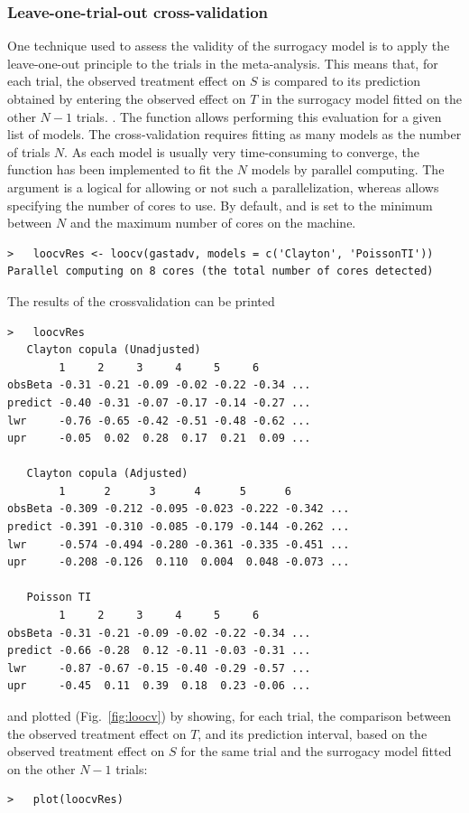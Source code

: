 \documentclass[]{scrartcl}\usepackage[]{graphicx}\usepackage[]{color}
\begin{document}
{{%
\subsubsection{Leave-one-trial-out cross-validation}
One technique used to assess the validity of the surrogacy model
  is to apply the leave-one-out principle to the trials in the meta-analysis.
This means that, for each trial, the observed treatment effect on $S$
  is compared to its prediction obtained by
  entering the observed effect on $T$
  in the surrogacy model fitted on the other $N-1$ trials.
\citep{Michiels09, Mauguen13, Rotolo17}.
The function  allows performing this evaluation for
  a given list of models.
The cross-validation requires fitting as many models as the number of trials $N$.
As each model is usually very time-consuming to converge,
  the function  has been implemented to
  fit the $N$ models by parallel computing.
The argument  is a logical for allowing or not such a parallelization,
  whereas  allows specifying the number of cores to use.
By default,  and  is set to the minimum
  between $N$ and the maximum number of cores on the machine.
\begin{lstlisting}
>   loocvRes <- loocv(gastadv, models = c('Clayton', 'PoissonTI'))
Parallel computing on 8 cores (the total number of cores detected)
\end{lstlisting}
The results of the crossvalidation can be printed
\begin{lstlisting}
>   loocvRes
   Clayton copula (Unadjusted) 
        1     2     3     4     5     6        
obsBeta -0.31 -0.21 -0.09 -0.02 -0.22 -0.34 ...
predict -0.40 -0.31 -0.07 -0.17 -0.14 -0.27 ...
lwr     -0.76 -0.65 -0.42 -0.51 -0.48 -0.62 ...
upr     -0.05  0.02  0.28  0.17  0.21  0.09 ...

   Clayton copula (Adjusted) 
        1      2      3      4      5      6         
obsBeta -0.309 -0.212 -0.095 -0.023 -0.222 -0.342 ...
predict -0.391 -0.310 -0.085 -0.179 -0.144 -0.262 ...
lwr     -0.574 -0.494 -0.280 -0.361 -0.335 -0.451 ...
upr     -0.208 -0.126  0.110  0.004  0.048 -0.073 ...

   Poisson TI 
        1     2     3     4     5     6        
obsBeta -0.31 -0.21 -0.09 -0.02 -0.22 -0.34 ...
predict -0.66 -0.28  0.12 -0.11 -0.03 -0.31 ...
lwr     -0.87 -0.67 -0.15 -0.40 -0.29 -0.57 ...
upr     -0.45  0.11  0.39  0.18  0.23 -0.06 ...
\end{lstlisting}
and plotted (Fig.~\ref{fig:loocv}) by showing, 
  for each trial, the comparison between the observed 
  treatment effect on $T$, and its prediction interval,
  based on the observed treatment effect on $S$ for the same trial
  and the surrogacy model fitted on the other $N-1$ trials:
\begin{lstlisting}
>   plot(loocvRes)
\end{lstlisting}

}}
\end{document}
